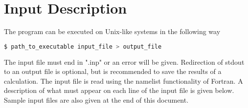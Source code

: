 \documentclass[12pt]{book}
\begin{document}
\section{Input Description}\label{inp_des}
The program can be executed on Unix-like systems in the following way
\begin{lstlisting}[language=bash]
	$ path_to_executable input_file > output_file
\end{lstlisting}

The input file must end in ".inp" or an error will be given. Redirection of stdout to an output file is optional, but is recommended to save the results of a calculation. The input file is read using the namelist functionality of Fortran. A description of what must appear on each line of the input file is given below. Sample input files are also given at the end of this document.
\end{document}
